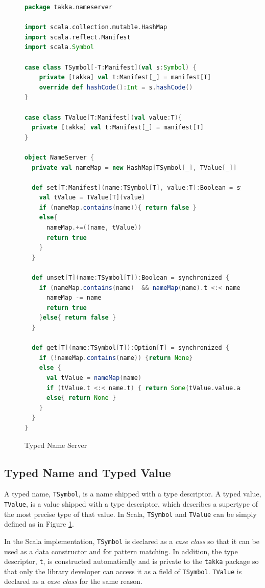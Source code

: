 \begin{figure}[p]
\begin{lstlisting}[language=scala]
package takka.nameserver

import scala.collection.mutable.HashMap
import scala.reflect.Manifest
import scala.Symbol

case class TSymbol[-T:Manifest](val s:Symbol) {
    private [takka] val t:Manifest[_] = manifest[T]
    override def hashCode():Int = s.hashCode()  
}

case class TValue[T:Manifest](val value:T){
  private [takka] val t:Manifest[_] = manifest[T]
}

object NameServer {
  private val nameMap = new HashMap[TSymbol[_], TValue[_]]

  def set[T:Manifest](name:TSymbol[T], value:T):Boolean = synchronized {
    val tValue = TValue[T](value)
    if (nameMap.contains(name)){ return false }
    else{
      nameMap.+=((name, tValue))
      return true
    }
  }

  def unset[T](name:TSymbol[T]):Boolean = synchronized {
    if (nameMap.contains(name)  && nameMap(name).t <:< name.t  ){
      nameMap -= name
      return true
    }else{ return false }
  }  

  def get[T](name:TSymbol[T]):Option[T] = synchronized {
    if (!nameMap.contains(name)) {return None}
    else { 
      val tValue = nameMap(name)
      if (tValue.t <:< name.t) { return Some(tValue.value.asInstanceOf[T]) }
      else{ return None }
    }
  }
}
\end{lstlisting}
  \caption{Typed Name Server}
  \label{fig:takka_nameserver} 
\end{figure}




\subsection{Typed Name and Typed Value}

A typed name, {\tt TSymbol}, is a name shipped with a type descriptor.  A 
typed value, {\tt TValue}, is a value shipped with a type descriptor, which
describes a supertype of the most precise type of that value.  
In Scala, {\tt TSymbol} and {\tt TValue} can be simply defined as in Figure
\ref{fig:takka_nameserver}.

In the Scala implementation, {\tt TSymbol} is declared as a {\it case class} so that it can be 
used as a data constructor and for pattern matching.  In addition, the
type descriptor, {\tt t}, is constructed automatically and is private to the
{\tt takka} package so that only the library developer can access it as a field 
 of {\tt TSymbol}. {\tt TValue} is declared as a {\it case class} for the same 
reason.  


